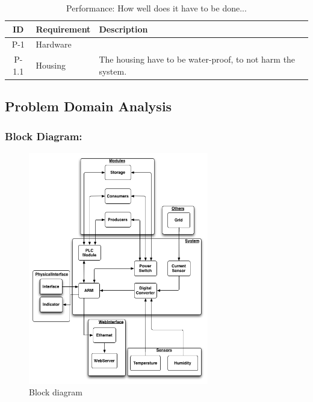 		\begin{table}[H]
			\begin{tabular} [b] {| c | p{3cm} | p{10cm} |}
			\hline
			\textbf{ID} & \textbf{Requirement} & \textbf{Description} \\\hline
			P-1 & Hardware 		&  \\ \hline
			P-1.1 & Housing 		& The housing have to be water-proof, to not harm the system.\\ \hline
		\end{tabular}
		\caption{Performance: How well does it have to be done...}
		\end{table}
	\subsection{Problem Domain Analysis}

			\subsubsection{Block Diagram:}
			\begin{figure}[h!]		%
				\begin{centering}
					 \includegraphics[width=0.7\textwidth]{images/block_diagram.png}
		 			\caption{Block diagram}
			 	\end{centering}
			\end{figure}
	\newpage
